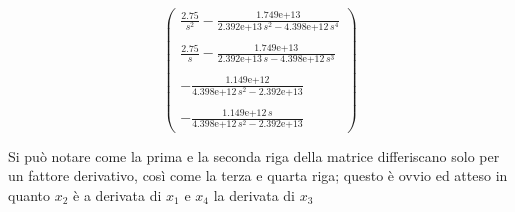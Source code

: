 \begin{center}
		$$
		\left(\begin{array}{c}
		\frac{2.75}{s^2 }-\frac{\text{1.749e+13}}{\text{2.392e+13}\,s^2 -\text{4.398e+12}\,s^4 }\\ \\
		\frac{2.75}{s}-\frac{\text{1.749e+13}}{\text{2.392e+13}\,s-\text{4.398e+12}\,s^3 }\\ \\
		-\frac{\text{1.149e+12}}{\text{4.398e+12}\,s^2 -\text{2.392e+13}}\\ \\
		-\frac{\text{1.149e+12}\,s}{\text{4.398e+12}\,s^2 -\text{2.392e+13}}
		\end{array}\right)
		$$
\end{center}
Si può notare come la prima e la seconda riga della matrice differiscano solo per un fattore derivativo, così come la terza e quarta riga; questo è ovvio ed atteso in quanto $x_2$ è a derivata di $x_1$ e $x_4$ la derivata di $x_3$
